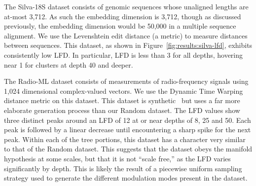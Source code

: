 The Silva-18S dataset consists of genomic sequences whose unaligned lengths are at-most 3,712.
As such the embedding dimension is 3,712, though as discussed previously, the embedding dimension would be 50,000 in a multiple sequence alignment.
We use the Levenshtein edit distance (a metric) to measure distances between sequences.
This dataset, as shown in Figure~\ref{fig:results:silva-lfd}, exhibits consistently low LFD.
In particular, LFD is less than 3 for all depths, hovering near 1 for clusters at depth 40 and deeper.

The Radio-ML dataset consists of measurements of radio-frequency signals using 1,024 dimensional complex-valued vectors.
We use the Dynamic Time Warping distance metric on this dataset.
This dataset is synthetic~\cite{oshea2018radioml} but uses a far more elaborate generation process than our Random dataset.
The LFD values show three distinct peaks around an LFD of 12 at or near depths of 8, 25 and 50.
Each peak is followed by a linear decrease until encountering a sharp spike for the next peak.
Within each of the tree portions, this dataset has a character very similar to that of the Random dataset.
This suggests that the dataset obeys the manifold hypothesis at some scales, but that it is not ``scale free,'' as the LFD varies significantly by depth.
This is likely the result of a piecewise uniform sampling strategy used to generate the different modulation modes present in the dataset.

